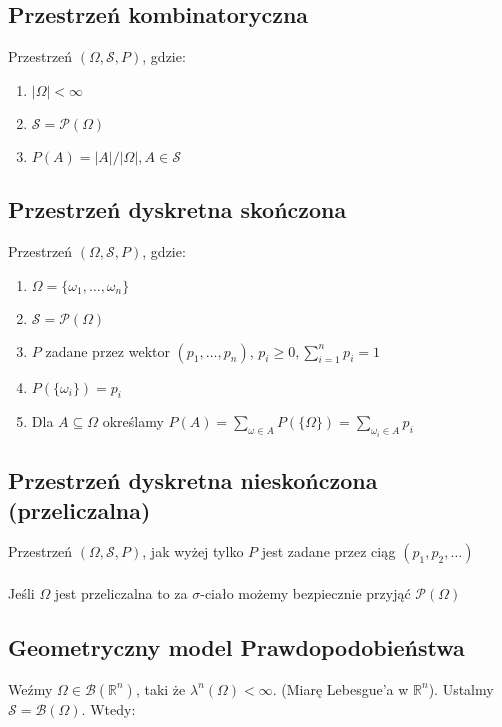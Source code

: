 \documentclass{article}
\begin{document}
\subsection{Przestrzeń kombinatoryczna}

Przestrzeń \( (\Omega, \mathcal{S}, P) \), gdzie:
\begin{enumerate}
    \item $|\Omega| < \infty$
    \item $\mathcal{S} = \mathcal{P}(\Omega)$
    \item $P(A) = |A|/|\Omega|, A\in\mathcal{S}$
\end{enumerate}

\subsection{Przestrzeń dyskretna skończona}
Przestrzeń \( (\Omega, \mathcal{S}, P) \), gdzie:
\begin{enumerate}
    \item $\Omega = \{\omega_1, \dots, \omega_n\}$
    \item $\mathcal{S} = \mathcal{P}(\Omega)$
    \item $P$ zadane przez wektor $(p_1, \dots, p_n)$, $p_i \geq 0, \sum_{i=1}^{n} p_i = 1$
    \item $P(\{\omega_i \}) = p_i$
    \item Dla $A\subseteq \Omega$ określamy $P(A)=\sum_{\omega\in A} P(\{\Omega\}) = \sum_{\omega_i\in A} p_i$ 
\end{enumerate}

\subsection{Przestrzeń dyskretna nieskończona (przeliczalna)}
Przestrzeń \( (\Omega, \mathcal{S}, P) \), jak wyżej tylko $P$ jest zadane przez ciąg $(p_1, p_2, \dots)$\\\\
Jeśli $\Omega$ jest przeliczalna to za $\sigma$-ciało możemy bezpiecznie przyjąć $\mathcal{P}(\Omega)$

\subsection{Geometryczny model Prawdopodobieństwa}

Weźmy $\Omega\in\mathcal{B}(\mathbb{R}^n)$, taki że $\lambda^n(\Omega) < \infty$. (Miarę Lebesgue'a w $\mathbb{R}^n$). Ustalmy $\mathcal{S}=\mathcal{B}(\Omega)$. Wtedy:
\end{document}
